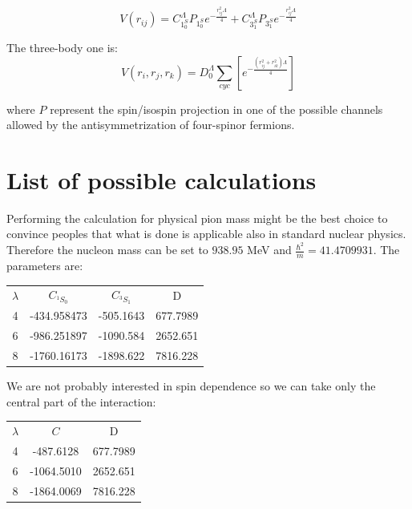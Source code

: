 \documentclass{article}
\begin{document}
\begin{equation}
    V(r_{ij})=C_{1^S_0}^\Lambda P_{1^S_0} e^{-\frac{r_{ij}^2\Lambda}{4}} + 
              C_{3^S_1}^\Lambda P_{3^S_1} e^{-\frac{r_{ij}^2\Lambda}{4}}
\end{equation}

The three-body one is:
\begin{equation}
    V(r_i,r_j,r_k)=D_0^\Lambda \sum_{cyc} \left[ e^{-\frac{\left(r_{ij}^2+r_{ik}^2\right)\Lambda}{4}} \right] 
\end{equation}

where $P$ represent the spin/isospin projection in one of the possible channels allowed by the antisymmetrization of four-spinor fermions. 


\section{List of possible calculations}

Performing the calculation for physical pion mass might be the best choice to convince peoples that what is done is applicable also in standard nuclear physics.
Therefore the nucleon mass can be set to $938.95$ MeV and $\frac{\hbar^2}{m}=41.4709931$.
The parameters are:

\begin{center}
\begin{tabular}{  c c c c }
 $\lambda$   &  $C_{^1S_0}$ &  $C_{^3S_1}$ &    D \\
4            & -434.958473  &	-505.1643  &	677.7989\\
                       6            & -986.251897  &	-1090.584  &	2652.651\\
                       8            & -1760.16173  &	-1898.622  &	7816.228\\
\end{tabular}
\end{center}

We are not probably interested in spin dependence so we can take only the central part of the interaction:

\begin{center}
\begin{tabular}{ c c c }
 $\lambda$   &   $C$      &    D \\
4            & -487.6128  &	677.7989\\
6            & -1064.5010 & 2652.651\\
8            & -1864.0069 & 7816.228\\
\end{tabular}
\end{center}
\end{document}
